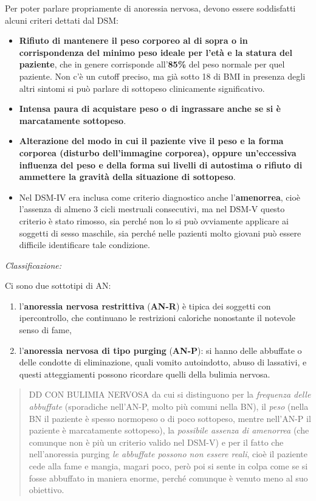 \documentclass[]{article}
\begin{document}
Per poter parlare propriamente di anoressia nervosa, devono essere
soddisfatti alcuni criteri dettati dal DSM:

\begin{itemize}
\item
  \textbf{Rifiuto di mantenere il peso corporeo al di sopra o in
  corrispondenza del minimo peso ideale per l'età e la statura del
  paziente}, che in genere corrisponde all'\textbf{85\%} del peso
  normale per quel paziente. Non c'è un cutoff preciso, ma già sotto 18
  di BMI in presenza degli altri sintomi si può parlare di sottopeso
  clinicamente significativo.
\item
  \textbf{Intensa paura di acquistare peso o di ingrassare anche se si è
  marcatamente sottopeso}.
\item
  \textbf{Alterazione del modo in cui il paziente vive il peso e la
  forma corporea (disturbo dell'immagine corporea), oppure un'eccessiva
  influenza del peso e della forma sui livelli di autostima o rifiuto di
  ammettere la gravità della situazione di sottopeso}.
\item
  Nel DSM-IV era inclusa come criterio diagnostico anche
  l'\textbf{amenorrea}, cioè l'assenza di almeno 3 cicli mestruali
  consecutivi, ma nel DSM-V questo criterio è stato rimosso, sia perché
  non lo si può ovviamente applicare ai soggetti di sesso maschile, sia
  perché nelle pazienti molto giovani può essere difficile identificare
  tale condizione.
\end{itemize}

\emph{\emph{Classificazione:}}

Ci sono due sottotipi di AN:

\begin{enumerate}
\def\labelenumi{\arabic{enumi}.}
\item
  l'\textbf{anoressia nervosa restrittiva} (\textbf{AN-R}) è tipica dei
  soggetti con ipercontrollo, che continuano le restrizioni caloriche
  nonostante il notevole senso di fame,
\item
  l'\textbf{anoressia nervosa di tipo purging} (\textbf{AN-P}): si hanno
  delle abbuffate o delle condotte di eliminazione, quali vomito
  autoindotto, abuso di lassativi, e questi atteggiamenti possono
  ricordare quelli della bulimia nervosa.
\end{enumerate}

\begin{quote}
DD CON BULIMIA NERVOSA da cui si distinguono per la \emph{frequenza
delle abbuffate} (sporadiche nell'AN-P, molto più comuni nella BN), il
\emph{peso} (nella BN il paziente è spesso normopeso o di poco
sottopeso, mentre nell'AN-P il paziente è marcatamente sottopeso), la
\emph{possibile assenza di amenorrea} (che comunque non è più un
criterio valido nel DSM-V) e per il fatto che nell'anoressia purging
\emph{le abbuffate possono non essere reali}, cioè il paziente cede alla
fame e mangia, magari poco, però poi si sente in colpa come se si fosse
abbuffato in maniera enorme, perché comunque è venuto meno al suo
obiettivo.
\end{quote}
\end{document}
